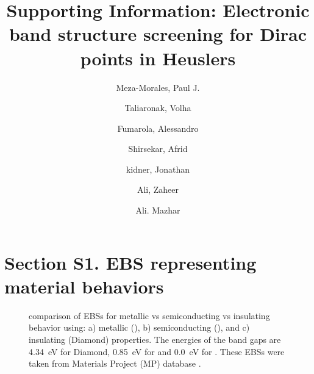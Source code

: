 \documentclass{article}
\title{Supporting Information: Electronic band structure screening for Dirac points in Heuslers}
\author{Meza-Morales, Paul J.}
\author{Taliaronak, Volha}
\author{Fumarola, Alessandro}
\author{Shirsekar, Afrid}
\author{kidner, Jonathan}
\author{Ali, Zaheer}
\author{Ali. Mazhar}
\affil{Material Mind, Fremont, CA 94555, United States}
\begin{document}
\maketitle

\section*{Section S1. EBS representing material behaviors}
\begin{figure}[H]
    \centering


    \caption{comparison of EBSs for metallic vs semiconducting vs insulating behavior using: a) metallic (), b) semiconducting (), and c) insulating (Diamond) properties. The energies of the band gaps are \SI{4.34}{\electronvolt} for Diamond, \SI{0.85}{\electronvolt} for  and \SI{0.0}{\electronvolt} for . These EBSs were taken from Materials Project (MP) database \cite{Jain2013,jain2013commentary,ong2015materials}.}
    \label{fig:EBS_classical}
\end{figure}
\end{document}
